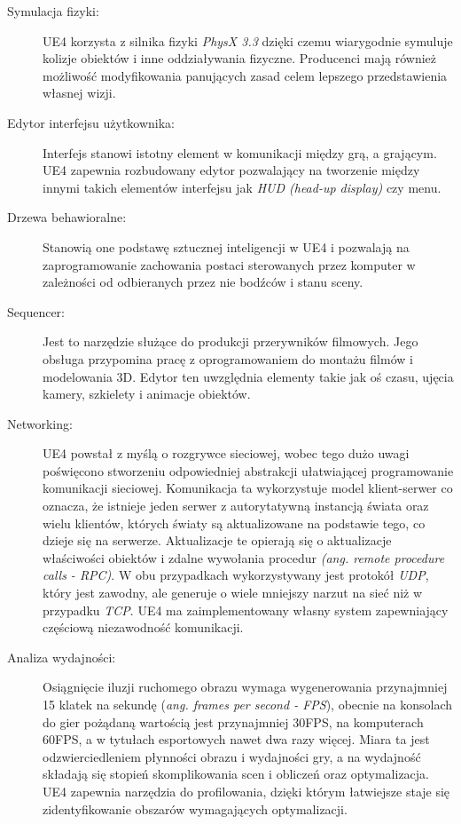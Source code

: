 \documentclass[multip]{SGGW-thesis}
\begin{document}
\begin{description}
\item[Symulacja fizyki:]UE4 korzysta z silnika fizyki {\em PhysX 3.3} dzięki czemu wiarygodnie symuluje kolizje obiektów i inne oddziaływania fizyczne. Producenci mają również możliwość modyfikowania panujących zasad celem lepszego przedstawienia własnej wizji.
\item[Edytor interfejsu użytkownika:] Interfejs stanowi istotny element w komunikacji między grą, a grającym. UE4 zapewnia rozbudowany edytor pozwalający na tworzenie między innymi takich elementów interfejsu jak {\em HUD (head-up display)} czy menu.
\item[Drzewa behawioralne:]Stanowią one podstawę sztucznej inteligencji w UE4 i pozwalają na zaprogramowanie zachowania postaci sterowanych przez komputer w zależności od odbieranych przez nie bodźców i stanu sceny.
\clearpage \item[Sequencer:]Jest to narzędzie służące do produkcji przerywników filmowych. Jego obsługa przypomina pracę z oprogramowaniem do montażu filmów i modelowania 3D. Edytor ten uwzględnia elementy takie jak oś czasu, ujęcia kamery, szkielety i animacje obiektów.
\item[Networking:]UE4 powstał z myślą o rozgrywce sieciowej, wobec tego dużo uwagi poświęcono stworzeniu odpowiedniej abstrakcji ułatwiającej programowanie komunikacji sieciowej. Komunikacja ta wykorzystuje model klient-serwer co oznacza, że istnieje jeden serwer z autorytatywną instancją świata oraz wielu klientów, których światy są aktualizowane na podstawie tego, co dzieje się na serwerze. Aktualizacje te opierają się o aktualizacje właściwości obiektów i zdalne wywołania procedur {\em (ang. remote procedure calls - RPC)}. W obu przypadkach wykorzystywany jest protokół {\em UDP}, który jest zawodny, ale generuje o wiele mniejszy narzut na sieć niż w przypadku {\em TCP}. UE4 ma zaimplementowany własny system zapewniający częściową niezawodność komunikacji. \cite{unreal-wiki-replication}
\item[Analiza wydajności:]Osiągnięcie iluzji ruchomego obrazu wymaga wygenerowania przynajmniej 15 klatek na sekundę ({\em ang. frames per second - FPS}), obecnie na konsolach do gier pożądaną wartością jest przynajmniej 30FPS, na komputerach 60FPS, a w tytułach esportowych nawet dwa razy więcej. Miara ta jest odzwierciedleniem płynności obrazu i wydajności gry, a na wydajność składają się stopień skomplikowania scen i obliczeń oraz optymalizacja. UE4 zapewnia narzędzia do profilowania, dzięki którym łatwiejsze staje się zidentyfikowanie obszarów wymagających optymalizacji.

\end{description}
\end{document}
